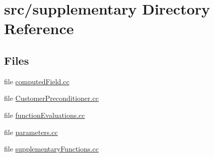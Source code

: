 \section{src/supplementary Directory Reference}
\label{dir_27fa0957a32c821707d4ee822bc7c77b}
\subsection*{Files}
\begin{DoxyCompactItemize}
\item 
file \mbox{\hyperlink{computed_field_8cc}{computed\+Field.\+cc}}
\item 
file \mbox{\hyperlink{_customer_preconditioner_8cc}{Customer\+Preconditioner.\+cc}}
\item 
file \mbox{\hyperlink{function_evaluations_8cc}{function\+Evaluations.\+cc}}
\item 
file \mbox{\hyperlink{parameters_8cc}{parameters.\+cc}}
\item 
file \mbox{\hyperlink{supplementary_functions_8cc}{supplementary\+Functions.\+cc}}
\end{DoxyCompactItemize}
